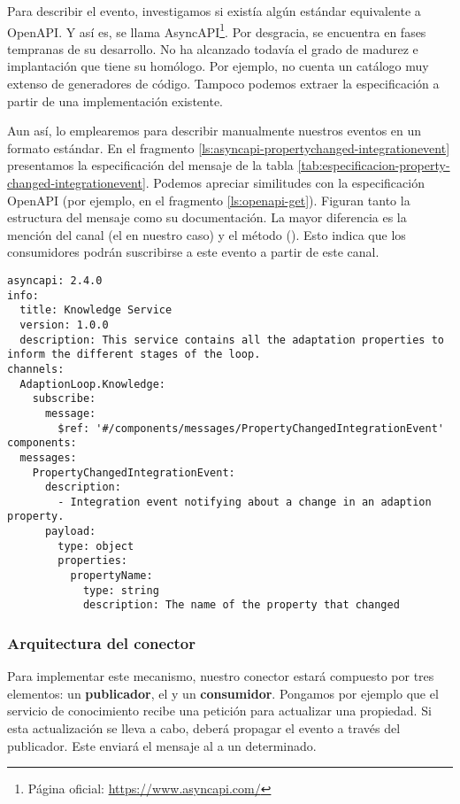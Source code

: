 Para describir el evento, investigamos si existía algún estándar equivalente a OpenAPI. Y así es, se llama AsyncAPI\footnote{Página oficial: \url{https://www.asyncapi.com/}}. Por desgracia, se encuentra en fases tempranas de su desarrollo. No ha alcanzado todavía el grado de madurez e implantación que tiene su homólogo. Por ejemplo, no cuenta un catálogo muy extenso de generadores de código. Tampoco podemos extraer la especificación a partir de una implementación existente.

Aun así, lo emplearemos para describir manualmente nuestros eventos en un formato estándar. En el fragmento \ref{ls:asyncapi-propertychanged-integrationevent} presentamos la especificación del mensaje de la tabla \ref{tab:especificacion-property-changed-integrationevent}. Podemos apreciar similitudes con la especificación OpenAPI (por ejemplo, en el fragmento \ref{ls:openapi-get}). Figuran tanto la estructura del mensaje como su documentación. La mayor diferencia es la mención del canal (el   en nuestro caso) y el método (). Esto indica que los consumidores podrán suscribirse a este evento a partir de este canal.

\pagebreak

\begin{lstlisting}[style=yaml,caption={Especificación del evento de integración \emph{PropertyChangedIntegrationEvent} en el lenguaje AsyncAPI.},captionpos=b, label=ls:asyncapi-propertychanged-integrationevent]
asyncapi: 2.4.0
info:
  title: Knowledge Service
  version: 1.0.0
  description: This service contains all the adaptation properties to inform the different stages of the loop.
channels:
  AdaptionLoop.Knowledge:
    subscribe:
      message:
        $ref: '#/components/messages/PropertyChangedIntegrationEvent'
components:
  messages:
    PropertyChangedIntegrationEvent:
      description:
        - Integration event notifying about a change in an adaption property.
      payload:
        type: object
        properties:
          propertyName:
            type: string
            description: The name of the property that changed
\end{lstlisting}

\subsubsection{Arquitectura del conector}

Para implementar este mecanismo, nuestro conector estará compuesto por tres elementos: un \textbf{publicador}, el \textbf{} y un \textbf{consumidor}. Pongamos por ejemplo que el servicio de conocimiento recibe una petición para actualizar una propiedad. Si esta actualización se lleva a cabo, deberá propagar el evento a través del publicador. Este enviará el mensaje al  a un  determinado.

